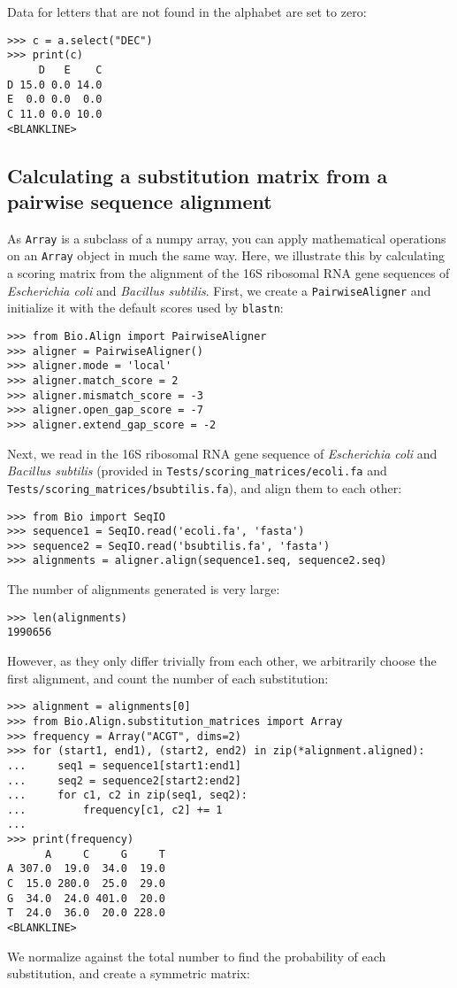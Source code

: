 Data for letters that are not found in the alphabet are set to zero:
\begin{verbatim}
>>> c = a.select("DEC")
>>> print(c)
     D   E    C
D 15.0 0.0 14.0
E  0.0 0.0  0.0
C 11.0 0.0 10.0
<BLANKLINE>
\end{verbatim}

\subsection*{Calculating a substitution matrix from a pairwise sequence alignment}

As \verb+Array+ is a subclass of a numpy array, you can apply mathematical operations on an \verb+Array+ object in much the same way. Here, we illustrate this by calculating a scoring matrix from the alignment of the 16S ribosomal RNA gene sequences of {\it Escherichia coli} and {\it Bacillus subtilis}. First, we create a \verb+PairwiseAligner+ and initialize it with the default scores used by \verb+blastn+:

\begin{verbatim}
>>> from Bio.Align import PairwiseAligner
>>> aligner = PairwiseAligner()
>>> aligner.mode = 'local'
>>> aligner.match_score = 2
>>> aligner.mismatch_score = -3
>>> aligner.open_gap_score = -7
>>> aligner.extend_gap_score = -2
\end{verbatim}
Next, we read in the 16S ribosomal RNA gene sequence of {\it Escherichia coli} and {\it Bacillus subtilis} (provided in \verb+Tests/scoring_matrices/ecoli.fa+ and \verb+Tests/scoring_matrices/bsubtilis.fa+), and align them to each other:

\begin{verbatim}
>>> from Bio import SeqIO
>>> sequence1 = SeqIO.read('ecoli.fa', 'fasta')
>>> sequence2 = SeqIO.read('bsubtilis.fa', 'fasta')
>>> alignments = aligner.align(sequence1.seq, sequence2.seq)
\end{verbatim}
The number of alignments generated is very large:

\begin{verbatim}
>>> len(alignments)
1990656
\end{verbatim}
However, as they only differ trivially from each other, we arbitrarily choose the first alignment, and count the number of each substitution:

\begin{verbatim}
>>> alignment = alignments[0]
>>> from Bio.Align.substitution_matrices import Array
>>> frequency = Array("ACGT", dims=2)
>>> for (start1, end1), (start2, end2) in zip(*alignment.aligned):
...     seq1 = sequence1[start1:end1]
...     seq2 = sequence2[start2:end2]
...     for c1, c2 in zip(seq1, seq2):
...         frequency[c1, c2] += 1
...
>>> print(frequency)
      A     C     G     T
A 307.0  19.0  34.0  19.0
C  15.0 280.0  25.0  29.0
G  34.0  24.0 401.0  20.0
T  24.0  36.0  20.0 228.0
<BLANKLINE>
\end{verbatim}
We normalize against the total number to find the probability of each substitution, and create a symmetric matrix:

